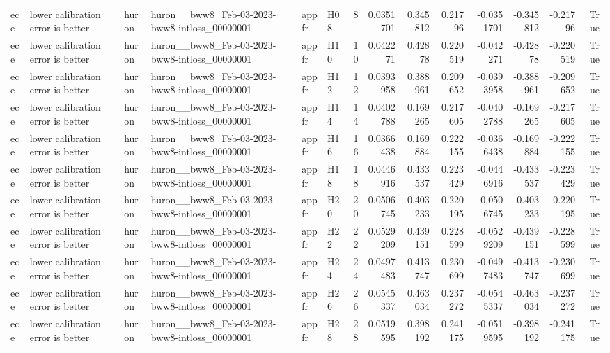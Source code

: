 \begin{longtable}{llllllrrrrrrrr}
ece & lower calibration error is better & huron & huron\_\_bww8\_Feb-03-2023-bww8-intloss\_00000001 & appfr & H08 & 8 & 0.0351701 & 0.345812 & 0.21796 & -0.0351701 & -0.345812 & -0.21796 & True \\
ece & lower calibration error is better & huron & huron\_\_bww8\_Feb-03-2023-bww8-intloss\_00000001 & appfr & H10 & 10 & 0.042271 & 0.42878 & 0.220519 & -0.042271 & -0.42878 & -0.220519 & True \\
ece & lower calibration error is better & huron & huron\_\_bww8\_Feb-03-2023-bww8-intloss\_00000001 & appfr & H12 & 12 & 0.0393958 & 0.388961 & 0.209652 & -0.0393958 & -0.388961 & -0.209652 & True \\
ece & lower calibration error is better & huron & huron\_\_bww8\_Feb-03-2023-bww8-intloss\_00000001 & appfr & H14 & 14 & 0.0402788 & 0.169265 & 0.217605 & -0.0402788 & -0.169265 & -0.217605 & True \\
ece & lower calibration error is better & huron & huron\_\_bww8\_Feb-03-2023-bww8-intloss\_00000001 & appfr & H16 & 16 & 0.0366438 & 0.169884 & 0.222155 & -0.0366438 & -0.169884 & -0.222155 & True \\
ece & lower calibration error is better & huron & huron\_\_bww8\_Feb-03-2023-bww8-intloss\_00000001 & appfr & H18 & 18 & 0.0446916 & 0.433537 & 0.223429 & -0.0446916 & -0.433537 & -0.223429 & True \\
ece & lower calibration error is better & huron & huron\_\_bww8\_Feb-03-2023-bww8-intloss\_00000001 & appfr & H20 & 20 & 0.0506745 & 0.403233 & 0.220195 & -0.0506745 & -0.403233 & -0.220195 & True \\
ece & lower calibration error is better & huron & huron\_\_bww8\_Feb-03-2023-bww8-intloss\_00000001 & appfr & H22 & 22 & 0.0529209 & 0.439151 & 0.228599 & -0.0529209 & -0.439151 & -0.228599 & True \\
ece & lower calibration error is better & huron & huron\_\_bww8\_Feb-03-2023-bww8-intloss\_00000001 & appfr & H24 & 24 & 0.0497483 & 0.413747 & 0.230699 & -0.0497483 & -0.413747 & -0.230699 & True \\
ece & lower calibration error is better & huron & huron\_\_bww8\_Feb-03-2023-bww8-intloss\_00000001 & appfr & H26 & 26 & 0.0545337 & 0.463034 & 0.237272 & -0.0545337 & -0.463034 & -0.237272 & True \\
ece & lower calibration error is better & huron & huron\_\_bww8\_Feb-03-2023-bww8-intloss\_00000001 & appfr & H28 & 28 & 0.0519595 & 0.398192 & 0.241175 & -0.0519595 & -0.398192 & -0.241175 & True \\

\end{longtable}
